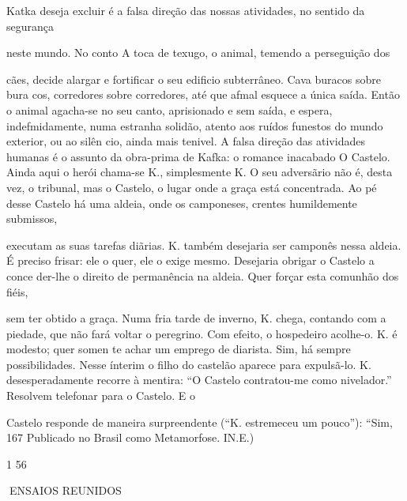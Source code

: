 Katka deseja excluir é a falsa direção das nossas atividades, no sentido
da segurança

neste mundo. No conto A toca de texugo, o animal, temendo a perseguição
dos

cães, decide alargar e fortificar o seu edificio subterrâneo. Cava
buracos sobre bura­ cos, corredores sobre corredores, até que afmal
esquece a única saída. Então o animal agacha-se no seu canto,
aprisionado e sem saída, e espera, indefmidamente, numa estranha
solidão, atento aos ruídos funestos do mundo exterior, ou ao silên­ cio,
ainda mais tenivel. A falsa direção das atividades humanas é o assunto
da obra-prima de Kafka: o romance inacabado O Castelo. Ainda aqui o
herói chama-se K., simplesmente K. O seu adversãrio não é, desta vez, o
tribunal, mas o Castelo, o lugar onde a graça está concentrada. Ao pé
desse Castelo há uma aldeia, onde os camponeses, crentes humildemente
submissos,

executam as suas tarefas diãrias. K. também desejaria ser camponês nessa
aldeia. É preciso frisar: ele o quer, ele o exige mesmo. Desejaria
obrigar o Castelo a conce­ der-lhe o direito de permanência na aldeia.
Quer forçar esta comunhão dos fiéis,

sem ter obtido a graça. Numa fria tarde de inverno, K. chega, contando
com a piedade, que não fará voltar o peregrino. Com efeito, o hospedeiro
acolhe-o. K. é modesto; quer somen­ te achar um emprego de diarista.
Sim, há sempre possibilidades. Nesse ínterim o filho do castelão aparece
para expulsã-lo. K. desesperadamente recorre à mentira: ``O Castelo
contratou-me como nivelador.'' Resolvem telefonar para o Castelo. E o

Castelo responde de maneira surpreendente (``K. estremeceu um pouco''):
``Sim, 167 Publicado no Brasil como Metamorfose. IN.E.)

1 56

ENSAIOS REUNIDOS

